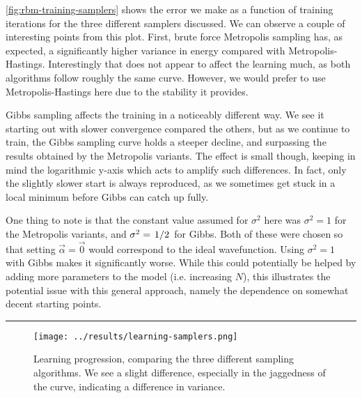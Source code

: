 \documentclass[a4paper, 11pt]{article}
\begin{document}
\begin{multicols}{2}

    \autoref{fig:rbm-training-samplers} shows the error we make as a function of
    training iterations for the three different samplers discussed. We can
    observe a couple of interesting points from this plot. First, brute force
    Metropolis sampling has, as expected, a significantly higher variance in
    energy compared with Metropolis-Hastings. Interestingly that does not appear
    to affect the learning much, as both algorithms follow roughly the same
    curve. However, we would prefer to use Metropolis-Hastings here due to the
    stability it provides. 

    Gibbs sampling affects the training in a noticeably different way. We see it
    starting out with slower convergence compared the others, but as we continue
    to train, the Gibbs sampling curve holds a steeper decline, and surpassing
    the results obtained by the Metropolis variants. The effect is small though,
    keeping in mind the logarithmic y-axis which acts to amplify such
    differences. In fact, only the slightly slower start is always reproduced,
    as we sometimes get stuck in a local minimum before Gibbs can catch up
    fully.

    One thing to note is that the constant value assumed for $\sigma^2$ here was
    $\sigma^2=1$ for the Metropolis variants, and $\sigma^2=\flatfrac{1}{2}$ for
    Gibbs. Both of these were chosen so that setting $\vec\alpha=\vec 0$ would
    correspond to the ideal wavefunction. Using $\sigma^2=1$ with Gibbs makes it
    significantly worse. While this could potentially be helped by adding more
    parameters to the model (i.e. increasing $N$), this illustrates the
    potential issue with this general approach, namely the dependence on
    somewhat decent starting points.


\end{multicols}
\hrule
\begin{figure}[ht]
    \centering
    \texttt{[image: ../results/learning-samplers.png]}
    \caption{Learning progression, comparing the three different sampling
    algorithms. We see a slight difference, especially in the jaggedness of the
    curve, indicating a difference in variance.}
    \label{fig:rbm-training-samplers}
\end{figure}
\end{document}
